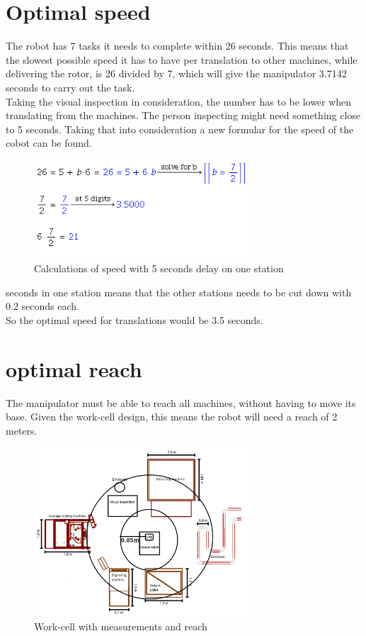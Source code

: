 \section{Optimal speed}

The robot has 7 tasks it needs to complete within 26 seconds. This means that the slowest possible speed it has to have per translation to other machines, while delivering the rotor, is 26 divided by 7, which will give the manipulator 3.7142 seconds to carry out the task.\\
Taking the visual inspection in consideration, the number has to be lower when translating from the machines. The person inspecting might need something close to 5 seconds. Taking that into consideration a new formular for the speed of the cobot can be found.

\begin{figure}
    \centering
    \includegraphics[width=8cm]{Design/idealrobotcalc.png}
    \caption{Calculations of speed with 5 seconds delay on one station}
    \label{fig:calculations}
\end{figure}
 seconds in one station means that the other stations needs to be cut down with 0.2 seconds each.\\
So the optimal speed for translations would be 3.5 seconds.

\section{optimal reach}

The manipulator must be able to reach all machines, without having to move its base. Given the work-cell design, this means the robot will need a reach of 2 meters. \\
\begin{figure}[h]
    \centering
    \includegraphics[width=8cm]{Design/Work_cell_3.png}
    \caption{Work-cell with measurements and reach}
    \label{fig:workcell}
\end{figure}

